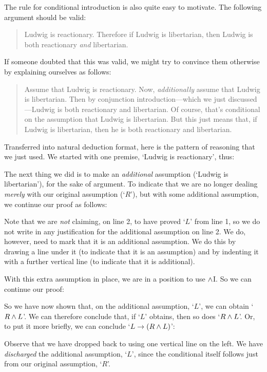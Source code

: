 The rule for conditional introduction is also quite easy to motivate. The following argument should be valid:
	\begin{quote}
		Ludwig is reactionary. Therefore if Ludwig is libertarian, then Ludwig is both reactionary \emph{and} libertarian.
	\end{quote}
If someone doubted that this was valid, we might try to convince them otherwise by explaining ourselves as follows:
	\begin{quote}
		Assume that Ludwig is reactionary. Now, \emph{additionally} assume that Ludwig is libertarian. Then by conjunction introduction---which we just discussed---Ludwig is both reactionary and libertarian. Of course, that's conditional on the assumption that Ludwig is libertarian. But this just means that, if Ludwig is libertarian, then he is both reactionary and libertarian.
	\end{quote}
Transferred into natural deduction format, here is the pattern of reasoning that we just used. We started with one premise, `Ludwig is reactionary', thus:
	\begin{fitchproof}
	\end{fitchproof}
The next thing we did is to make an \emph{additional} assumption (`Ludwig is libertarian'), for the sake of argument. To indicate that we are no longer dealing \emph{merely} with our original assumption (`$R$'), but with some additional assumption, we continue our proof as follows:
	\begin{fitchproof}
		\hypo{r}{R}
		\open
			\hypo{l}{L}
	\end{fitchproof}
Note that we are \emph{not} claiming, on line 2, to have proved `$L$' from line 1, so we do not write in any justification for the additional assumption on line 2. We do, however, need to mark that it is an additional assumption. We do this by drawing a line under it (to indicate that it is an assumption) and by indenting it with a further vertical line (to indicate that it is additional). 

With this extra assumption in place, we are in a position to use $\wedge$I. So we can continue our proof:
	\begin{fitchproof}
		\open
			\ai{r, l}
	\end{fitchproof}
So we have now shown that, on the additional assumption, `$L$', we can obtain `$R \wedge L$'. We can therefore conclude that, if `$L$' obtains, then so does `$R \wedge L$'. Or, to put it more briefly, we can conclude `$L \rightarrow (R \wedge L)$':
	\begin{fitchproof}
		\hypo{r}{R}
		\open
			\hypo{l}{L}
			\ai{r, l}
			\close
		\ci{l-rl}
	\end{fitchproof}
Observe that we have dropped back to using one vertical line on the left.  We have \emph{discharged} the additional assumption, `$L$', since the conditional itself follows just from our original assumption, `$R$'.

